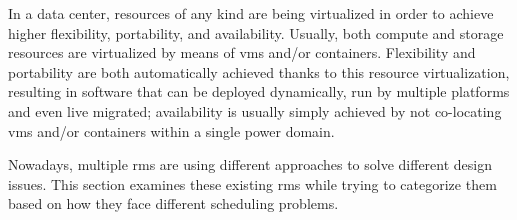 In a data center, resources of any kind are being virtualized in order to achieve higher flexibility, portability, and availability.
Usually, both compute and storage resources are virtualized by means of \glspl{vm} and/or containers.
Flexibility and portability are both automatically achieved thanks to this resource virtualization, resulting in software that can be deployed dynamically, run by multiple platforms and even live migrated; availability is usually simply achieved by not co-locating \glspl{vm} and/or containers within a single power domain.

Nowadays, multiple \glspl{rm} are using different approaches to solve different design issues.
This section examines these existing \glspl{rm} while trying to categorize them based on how they face different scheduling problems.